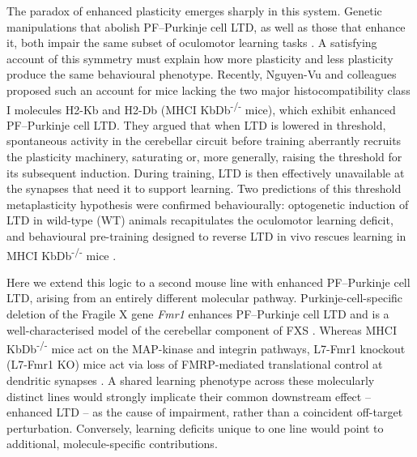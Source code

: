The paradox of enhanced plasticity emerges sharply in this system. Genetic manipulations that abolish PF--Purkinje cell LTD, as well as those that enhance it, both impair the same subset of oculomotor learning tasks \cite{nguyenvu2017saturation,koekkoek2005fmr1}. A satisfying account of this symmetry must explain how more plasticity and less plasticity produce the same behavioural phenotype. Recently, Nguyen-Vu and colleagues \cite{nguyenvu2017saturation} proposed such an account for mice lacking the two major histocompatibility class I molecules H2-Kb and H2-Db (MHCI KbDb\textsuperscript{-/-} mice), which exhibit enhanced PF--Purkinje cell LTD. They argued that when LTD is lowered in threshold, spontaneous activity in the cerebellar circuit before training aberrantly recruits the plasticity machinery, saturating or, more generally, raising the threshold for its subsequent induction. During training, LTD is then effectively unavailable at the synapses that need it to support learning. Two predictions of this threshold metaplasticity hypothesis were confirmed behaviourally: optogenetic induction of LTD in wild-type (WT) animals recapitulates the oculomotor learning deficit, and behavioural pre-training designed to reverse LTD in vivo rescues learning in MHCI KbDb\textsuperscript{-/-} mice \cite{nguyenvu2017saturation}.

Here we extend this logic to a second mouse line with enhanced PF--Purkinje cell LTD, arising from an entirely different molecular pathway. Purkinje-cell-specific deletion of the Fragile X gene \emph{Fmr1} enhances PF--Purkinje cell LTD and is a well-characterised model of the cerebellar component of FXS \cite{koekkoek2005fmr1,mientjes2006conditional,zhang2004l7cre,nosyreva2006fmr1}. Whereas MHCI KbDb\textsuperscript{-/-} mice act on the MAP-kinase and integrin pathways, L7-Fmr1 knockout (L7-Fmr1 KO) mice act via loss of FMRP-mediated translational control at dendritic synapses \cite{koekkoek2005fmr1,nosyreva2006fmr1}. A shared learning phenotype across these molecularly distinct lines would strongly implicate their common downstream effect -- enhanced LTD -- as the cause of impairment, rather than a coincident off-target perturbation. Conversely, learning deficits unique to one line would point to additional, molecule-specific contributions.

